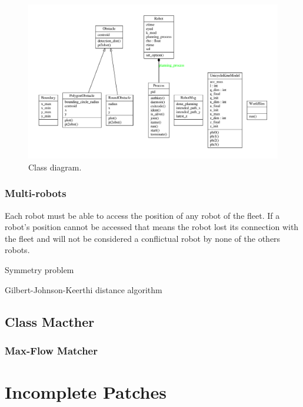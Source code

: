 \begin{figure}[!h]
	\centering
	\includegraphics[width=1.\textwidth]{./img/classes_planning.pdf}
	\caption{Class diagram.\label{fig:classesdiagram}}
\end{figure}


\subsection{Multi-robots}

Each robot must be able to access the position of any robot of the fleet. If a robot's position cannot be accessed that means the robot lost its connection with the fleet and will not be considered a conflictual robot by none of the others robots.


Symmetry problem 

Gilbert-Johnson-Keerthi distance algorithm

\newpage

\section{Class Macther}
\lipsum[1-2]
\subsection{Max-Flow Matcher}
\lipsum[1-3]

\chapter{Incomplete Patches}
\lipsum[1-10]